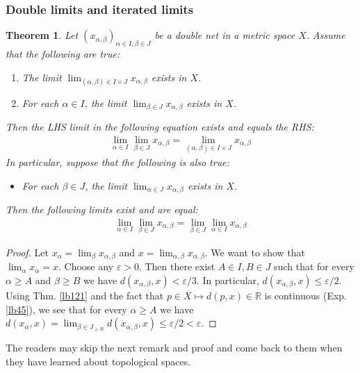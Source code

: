 \documentclass[12pt,b5paper,notitlepage]{article}
\theoremstyle{definition}
\theoremstyle{plain}
\newtheorem{thm}[df]{Theorem}
\newcommand{\Rbb}{\mathbb R}
\newcommand{\dps}{\displaystyle}
\newcommand{\eps}{\varepsilon}
\numberwithin{equation}{section}
\begin{document}
\subsubsection{Double limits and iterated limits}

\begin{thm}\label{lb122}
Let $(x_{\alpha,\beta})_{\alpha\in I,\beta\in J}$ be a double net in a metric space $X$. Assume that the following are true:
\begin{enumerate}[label=(\arabic*)]
\item The limit $\dps\lim_{(\alpha,\beta)\in I\times J}x_{\alpha,\beta}$ exists in $X$.
\item For each $\alpha\in I$, the limit $\dps\lim_{\beta\in J}x_{\alpha,\beta}$ exists in $X$.
\end{enumerate}
Then the LHS limit in the following equation exists and equals the RHS:
\begin{align}
\lim_{\alpha\in I}\lim_{\beta\in J}x_{\alpha,\beta}=\lim_{(\alpha,\beta)\in I\times J}x_{\alpha,\beta}
\end{align}
In particular, suppose that the following is also true:
\begin{itemize}
\item[(3)] For each $\beta\in J$, the limit $\dps\lim_{\alpha\in J}x_{\alpha,\beta}$ exists in $X$. 
\end{itemize}
Then the following limits exist and are equal:
\begin{align}
\lim_{\alpha\in I}\lim_{\beta\in J}x_{\alpha,\beta}=\lim_{\beta\in J}\lim_{\alpha\in I}x_{\alpha,\beta}
\end{align}
\end{thm}


\begin{proof}
Let $\dps x_\alpha=\lim_\beta x_{\alpha,\beta}$ and $\dps x=\lim_{\alpha,\beta}x_{\alpha,\beta}$. We want to show that $\dps\lim_\alpha x_\alpha=x$. Choose any $\eps>0$. Then there exist $A\in I,B\in J$ such that for every $\alpha\geq A$ and $\beta\geq B$ we have $d(x_{\alpha,\beta},x)<\eps/3$. In particular,  $d(x_{\alpha,\beta},x)\leq \eps/2$. Using Thm. \ref{lb121} and the fact that $p\in X\mapsto d(p,x)\in\Rbb$ is continuous (Exp. \ref{lb45}), we see that for every $\alpha\geq A$ we have $\dps d(x_\alpha,x)=\lim_{\beta\in J_{\geq B}} d(x_{\alpha,\beta},x)\leq \eps/2<\eps$.
\end{proof}

The readers may skip the next remark and proof and come back to them when they have learned about topological spaces.
\end{document}
